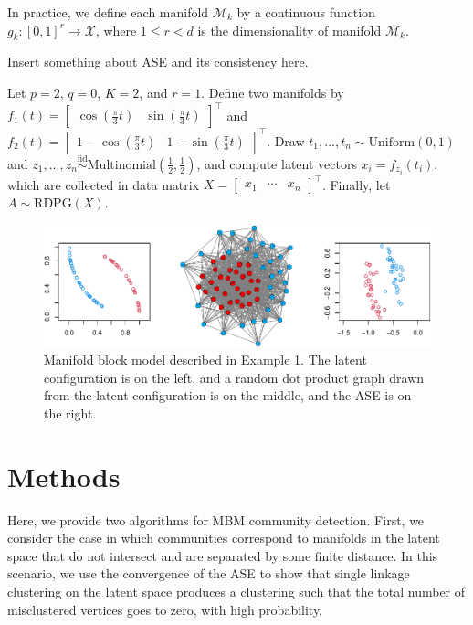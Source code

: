 \documentclass[12pt]{article}
\begin{document}
In practice, we define each manifold \(\mathcal{M}_k\) by a continuous
function \(g_k : [0, 1]^r \to \mathcal{X}\), where \(1 \leq r < d\) is
the dimensionality of manifold \(\mathcal{M}_k\).

Insert something about ASE and its consistency here.

\begin{example}
Let $p = 2$, $q = 0$, $K = 2$, and $r = 1$. 
Define two manifolds by $f_1(t) = \begin{bmatrix} \cos(\frac{\pi}{3} t) & \sin(\frac{\pi}{3} t) \end{bmatrix}^\top$ and $f_2(t) = \begin{bmatrix} 1 - \cos(\frac{\pi}{3} t) & 1 - \sin(\frac{\pi}{3} t) \end{bmatrix}^\top$.
Draw $t_1, ..., t_n \sim \mathrm{Uniform}(0, 1)$ and $z_1, ..., z_n \stackrel{\mathrm{iid}}{\sim}\mathrm{Multinomial}(\frac{1}{2}, \frac{1}{2})$, and compute latent vectors $x_i = f_{z_i}(t_i)$, which are collected in data matrix $X = \begin{bmatrix} x_1 & \cdots & x_n \end{bmatrix}^\top$. 
Finally, let $A \sim \mathrm{RDPG}(X)$. 

\begin{figure}[H]

{\centering \includegraphics{draft_files/figure-latex/fig1-1} 

}

\caption{Manifold block model described in Example 1. The latent configuration is on the left, and a random dot product graph drawn from the latent configuration is on the middle, and the ASE is on the right.}\label{fig:fig1}
\end{figure}
\end{example}

\hypertarget{methods}{%
\section{Methods}\label{methods}}

Here, we provide two algorithms for MBM community detection. First, we
consider the case in which communities correspond to manifolds in the
latent space that do not intersect and are separated by some finite
distance. In this scenario, we use the convergence of the ASE to show
that single linkage clustering on the latent space produces a clustering
such that the total number of misclustered vertices goes to zero, with
high probability.
\end{document}
